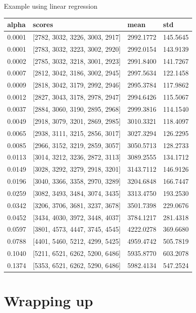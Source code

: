 \documentclass[obeyspaces,aspectratio=43]{beamer}
\begin{document}
\begin{frame}{Example using linear regression}

\tiny

\begin{longtable}[c]{@{}llll@{}}
\toprule
alpha & scores & mean & std\tabularnewline
\midrule
\endhead
0.0001 & {[}2782, 3032, 3226, 3003, 2917{]} & 2992.1772 &
145.5645\tabularnewline
0.0001 & {[}2783, 3032, 3223, 3002, 2920{]} & 2992.0154 &
143.9139\tabularnewline
0.0002 & {[}2785, 3032, 3218, 3001, 2923{]} & 2991.8400 &
141.7267\tabularnewline
0.0007 & {[}2812, 3042, 3186, 3002, 2945{]} & 2997.5634 &
122.1458\tabularnewline
0.0009 & {[}2818, 3042, 3179, 2992, 2946{]} & 2995.3784 &
117.9862\tabularnewline
0.0012 & {[}2827, 3043, 3178, 2978, 2947{]} & 2994.6426 &
115.5067\tabularnewline
0.0037 & {[}2884, 3060, 3190, 2895, 2968{]} & 2999.3816 &
114.1540\tabularnewline
0.0049 & {[}2918, 3079, 3201, 2869, 2985{]} & 3010.3321 &
118.4097\tabularnewline
0.0065 & {[}2938, 3111, 3215, 2856, 3017{]} & 3027.3294 &
126.2295\tabularnewline
0.0085 & {[}2966, 3152, 3219, 2859, 3057{]} & 3050.5713 &
128.2733\tabularnewline
0.0113 & {[}3014, 3212, 3236, 2872, 3113{]} & 3089.2555 &
134.1712\tabularnewline
0.0149 & {[}3028, 3292, 3279, 2918, 3201{]} & 3143.7112 &
146.9126\tabularnewline
0.0196 & {[}3040, 3366, 3358, 2970, 3289{]} & 3204.6848 &
166.7447\tabularnewline
0.0259 & {[}3082, 3493, 3484, 3074, 3435{]} & 3313.4750 &
193.2530\tabularnewline
0.0342 & {[}3206, 3706, 3681, 3237, 3678{]} & 3501.7398 &
229.0676\tabularnewline
0.0452 & {[}3434, 4030, 3972, 3448, 4037{]} & 3784.1217 &
281.4318\tabularnewline
0.0597 & {[}3801, 4573, 4447, 3745, 4545{]} & 4222.0278 &
369.6680\tabularnewline
0.0788 & {[}4401, 5460, 5212, 4299, 5425{]} & 4959.4742 &
505.7819\tabularnewline
0.1040 & {[}5211, 6521, 6262, 5200, 6486{]} & 5935.8770 &
603.2078\tabularnewline
0.1374 & {[}5353, 6521, 6262, 5290, 6486{]} & 5982.4134 &
547.2524\tabularnewline
\bottomrule
\end{longtable}

\end{frame}

\section{Wrapping up}\label{wrapping-up}
\end{document}
